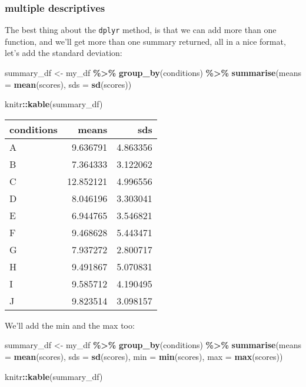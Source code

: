 \documentclass[
]{book}
\newenvironment{Shaded}{\begin{snugshade}}{\end{snugshade}}
\newcommand{\AttributeTok}[1]{\textcolor[rgb]{0.13,0.29,0.53}{#1}}
\newcommand{\FunctionTok}[1]{\textcolor[rgb]{0.13,0.29,0.53}{\textbf{#1}}}
\newcommand{\NormalTok}[1]{#1}
\newcommand{\OtherTok}[1]{\textcolor[rgb]{0.56,0.35,0.01}{#1}}
\newcommand{\SpecialCharTok}[1]{\textcolor[rgb]{0.81,0.36,0.00}{\textbf{#1}}}
\begin{document}
\hypertarget{multiple-descriptives}{%
\subsubsection{multiple descriptives}\label{multiple-descriptives}}

The best thing about the \texttt{dplyr} method, is that we can add more than one function, and we'll get more than one summary returned, all in a nice format, let's add the standard deviation:

\begin{Shaded}
\begin{Highlighting}[]
\NormalTok{summary\_df }\OtherTok{\textless{}{-}}\NormalTok{ my\_df }\SpecialCharTok{\%\textgreater{}\%}
               \FunctionTok{group\_by}\NormalTok{(conditions) }\SpecialCharTok{\%\textgreater{}\%}
               \FunctionTok{summarise}\NormalTok{(}\AttributeTok{means =} \FunctionTok{mean}\NormalTok{(scores),}
                         \AttributeTok{sds =} \FunctionTok{sd}\NormalTok{(scores))}

\NormalTok{knitr}\SpecialCharTok{::}\FunctionTok{kable}\NormalTok{(summary\_df)}
\end{Highlighting}
\end{Shaded}

\begin{tabular}{l|r|r}
\hline
conditions & means & sds\\
\hline
A & 9.636791 & 4.863356\\
\hline
B & 7.364333 & 3.122062\\
\hline
C & 12.852121 & 4.996556\\
\hline
D & 8.046196 & 3.303041\\
\hline
E & 6.944765 & 3.546821\\
\hline
F & 9.468628 & 5.443471\\
\hline
G & 7.937272 & 2.800717\\
\hline
H & 9.491867 & 5.070831\\
\hline
I & 9.585712 & 4.190495\\
\hline
J & 9.823514 & 3.098157\\
\hline
\end{tabular}

We'll add the min and the max too:

\begin{Shaded}
\begin{Highlighting}[]
\NormalTok{summary\_df }\OtherTok{\textless{}{-}}\NormalTok{ my\_df }\SpecialCharTok{\%\textgreater{}\%}
               \FunctionTok{group\_by}\NormalTok{(conditions) }\SpecialCharTok{\%\textgreater{}\%}
               \FunctionTok{summarise}\NormalTok{(}\AttributeTok{means =} \FunctionTok{mean}\NormalTok{(scores),}
                         \AttributeTok{sds =} \FunctionTok{sd}\NormalTok{(scores),}
                         \AttributeTok{min =} \FunctionTok{min}\NormalTok{(scores),}
                         \AttributeTok{max =} \FunctionTok{max}\NormalTok{(scores))}

\NormalTok{knitr}\SpecialCharTok{::}\FunctionTok{kable}\NormalTok{(summary\_df)}
\end{Highlighting}
\end{Shaded}
\end{document}
